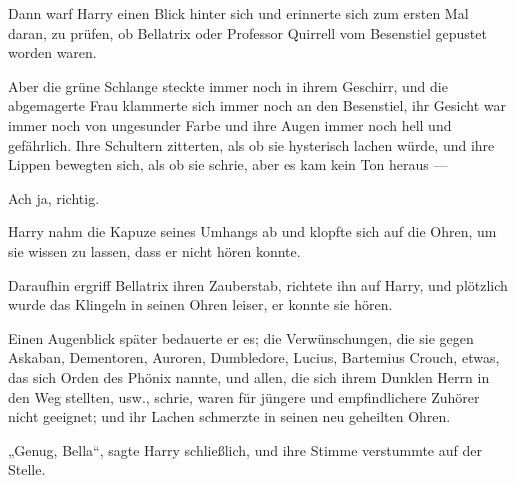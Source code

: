 Dann warf Harry einen Blick hinter sich und erinnerte sich zum ersten Mal daran, zu prüfen, ob Bellatrix oder Professor Quirrell vom Besenstiel gepustet worden waren.

Aber die grüne Schlange steckte immer noch in ihrem Geschirr, und die abgemagerte Frau klammerte sich immer noch an den Besenstiel, ihr Gesicht war immer noch von ungesunder Farbe und ihre Augen immer noch hell und gefährlich. Ihre Schultern zitterten, als ob sie hysterisch lachen würde, und ihre Lippen bewegten sich, als ob sie schrie, aber es kam kein Ton heraus —

Ach ja, richtig.

Harry nahm die Kapuze seines Umhangs ab und klopfte sich auf die Ohren, um sie wissen zu lassen, dass er nicht hören konnte.

Daraufhin ergriff Bellatrix ihren Zauberstab, richtete ihn auf Harry, und plötzlich wurde das Klingeln in seinen Ohren leiser, er konnte sie hören.

Einen Augenblick später bedauerte er es; die Verwünschungen, die sie gegen Askaban, Dementoren, Auroren, Dumbledore, Lucius, Bartemius Crouch, etwas, das sich Orden des Phönix nannte, und allen, die sich ihrem Dunklen Herrn in den Weg stellten, usw., schrie, waren für jüngere und empfindlichere Zuhörer nicht geeignet; und ihr Lachen schmerzte in seinen neu geheilten Ohren.

„Genug, Bella“, sagte Harry schließlich, und ihre Stimme verstummte auf der Stelle.

